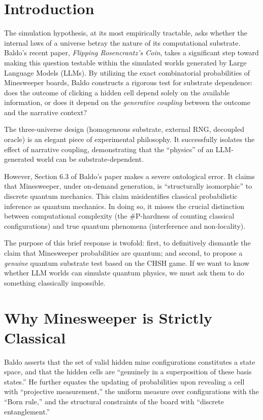 \documentclass[12pt,a4paper]{article}
\begin{document}
\section{Introduction}

The simulation hypothesis, at its most empirically tractable, asks whether the internal laws of a universe betray the nature of its computational substrate. Baldo's recent paper, \emph{Flipping Rosencrantz's Coin}, takes a significant step toward making this question testable within the simulated worlds generated by Large Language Models (LLMs). By utilizing the exact combinatorial probabilities of Minesweeper boards, Baldo constructs a rigorous test for substrate dependence: does the outcome of clicking a hidden cell depend solely on the available information, or does it depend on the \emph{generative coupling} between the outcome and the narrative context?

The three-universe design (homogeneous substrate, external RNG, decoupled oracle) is an elegant piece of experimental philosophy. It successfully isolates the effect of narrative coupling, demonstrating that the ``physics'' of an LLM-generated world can be substrate-dependent.

However, Section 6.3 of Baldo's paper makes a severe ontological error. It claims that Minesweeper, under on-demand generation, is ``structurally isomorphic'' to discrete quantum mechanics. This claim misidentifies classical probabilistic inference as quantum mechanics. In doing so, it misses the crucial distinction between computational complexity (the \#P-hardness of counting classical configurations) and true quantum phenomena (interference and non-locality).

The purpose of this brief response is twofold: first, to definitively dismantle the claim that Minesweeper probabilities are quantum; and second, to propose a \emph{genuine} quantum substrate test based on the CHSH game. If we want to know whether LLM worlds can simulate quantum physics, we must ask them to do something classically impossible.

\section{Why Minesweeper is Strictly Classical}

Baldo asserts that the set of valid hidden mine configurations constitutes a state space, and that the hidden cells are ``genuinely in a superposition of these basis states.'' He further equates the updating of probabilities upon revealing a cell with ``projective measurement,'' the uniform measure over configurations with the ``Born rule,'' and the structural constraints of the board with ``discrete entanglement.''
\end{document}
